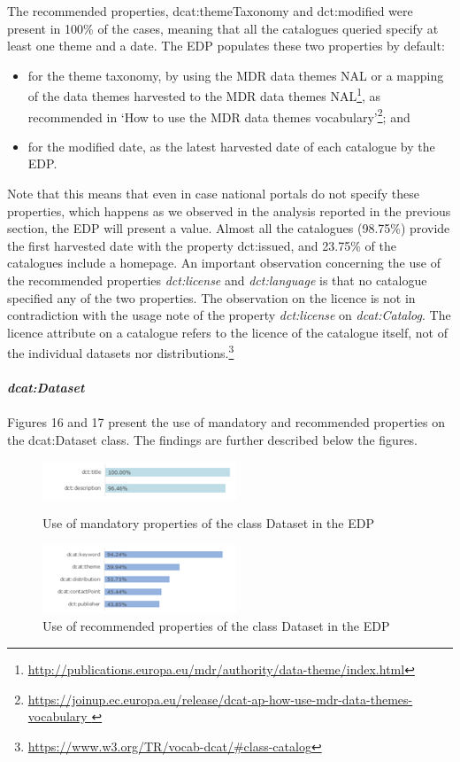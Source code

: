 \documentclass[<options>]{elsarticle}
\begin{document}
The recommended properties, dcat:themeTaxonomy and dct:modified were present in 100\% of the cases, meaning that all the catalogues queried specify at least one theme and a date. The EDP populates these two properties by default:
\begin{itemize}
\item for the theme taxonomy, by using the MDR data themes NAL or a mapping of the data themes harvested to the MDR data themes NAL\footnote{\href{http://publications.europa.eu/mdr/authority/data-theme/index.html}{ http://publications.europa.eu/mdr/authority/data-theme/index.html}}, as recommended in ‘How to use the MDR data themes vocabulary’\footnote{\href{https://joinup.ec.europa.eu/release/dcat-ap-how-use-mdr-data-themes-vocabulary}{  https://joinup.ec.europa.eu/release/dcat-ap-how-use-mdr-data-themes-vocabulary }}; and
\item for the modified date, as the latest harvested date of each catalogue by the EDP.
\end{itemize}
Note that this means that even in case national portals do not specify these properties, which happens as we observed in the analysis reported in the previous section, the EDP will present a value. Almost all the catalogues (98.75\%) provide the first harvested date with the property dct:issued, and 23.75\% of the catalogues include a homepage. 
An important observation concerning the use of the recommended properties \textit{dct:license} and \textit{dct:language} is that no catalogue specified any of the two properties. The observation on the licence is not in contradiction with the usage note of the property \textit{dct:license} on \textit{dcat:Catalog}. The licence attribute on a catalogue refers to the licence of the catalogue itself, not of the individual datasets nor distributions.\footnote{\href{https://www.w3.org/TR/vocab-dcat/\#class-catalog}{https://www.w3.org/TR/vocab-dcat/\#class-catalog}} 
\\
\\
\textbf{\textit{dcat:Dataset}}
\\
\\
Figures 16 and 17 present the use of mandatory and recommended properties on the dcat:Dataset class. The findings are further described below the figures.
\begin{figure}[!h]
\includegraphics{replace19.png}
\caption{Use of mandatory properties of the class Dataset in the EDP}
\includegraphics{replace20.png}
\caption{Use of recommended properties of the class Dataset in the EDP}
\end{figure}
\end{document}
